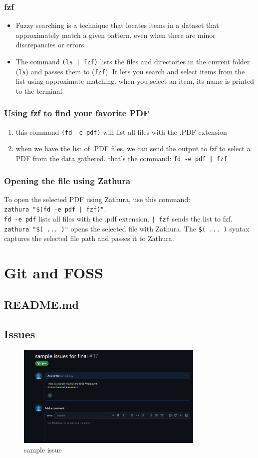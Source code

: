 \documentclass{article}
\begin{document}
        \subsubsection{fzf}
        \begin{itemize}
            \item Fuzzy searching is a technique that locates items in a dataset that approximately match a given pattern, even when there are minor discrepancies or errors.
            \item The command \texttt{(ls | fzf)} lists the files and directories in the current folder (\texttt{ls}) and passes them to (\texttt{fzf}). It lets you search and select items from the list using approximate matching. when you select an item, its name is printed to the terminal.
        \end{itemize}
        \subsubsection{Using fzf to find your favorite PDF}
        \begin{enumerate}
            \item this command \texttt{(fd -e pdf)} will list all files with the .PDF extension
            \item when we have the list of .PDF files, we can send the output to fzf to select a PDF from the data gathered. that’s the command: \texttt{fd -e pdf | fzf}
        \end{enumerate}
        \subsubsection{Opening the file using Zathura}
        To open the selected PDF using Zathura, use this command:\\ 
        \texttt{zathura "\$(fd -e pdf | fzf)"}.
        \\\texttt{fd -e pdf} lists all files with the .pdf extension. \texttt{| fzf} sends the list to fzf. \texttt{zathura "\$( ... )"} 
         opens the selected file with Zathura. The \texttt{\$( ... )} syntax captures the selected file path and passes it to Zathura.

\section{Git and FOSS}
    \subsection{README.md}
    \subsection{Issues}
    \begin{figure}[h]
    \centering
    \includegraphics[width=0.8\textwidth]{sample issue.png}
    \caption{sample issue}
    \end{figure}
        
\end{document}

